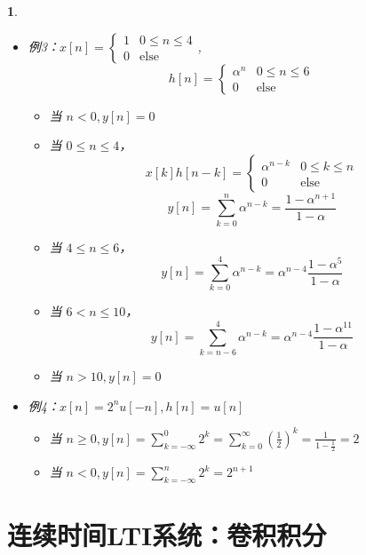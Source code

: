 \documentclass[UTF8]{report}
\theoremstyle{MyLineTheoremStyle} %
\theoremstyle{MyBlockTheoremStyle} %
\theoremstyle{MySubsubsectionStyle} %
\newtheorem{definition}{}
\begin{document}
\begin{definition}
\begin{itemize}
        \item 例3：$x[n] = \begin{cases} 
        1 & 0 \leq n \leq 4 \\
        0 & \text{else} 
        \end{cases}$,
        \[
        h[n] = \begin{cases} 
        \alpha^n & 0 \leq n \leq 6 \\
        0 & \text{else} 
        \end{cases}
        \]
        \begin{itemize}
            \item 当 $n < 0, y[n] = 0$
            \item 当 $0 \leq n \leq 4$，
            \[
            x[k] h[n - k] = \begin{cases} 
            \alpha^{n-k} & 0 \leq k \leq n \\
            0 & \text{else} 
            \end{cases}
            \]
            \[
            y[n] = \sum_{k=0}^{n} \alpha^{n-k} = \frac{1 - \alpha^{n+1}}{1 - \alpha}
            \]
            \item 当 $4 \leq n \leq 6$，
            \[
            y[n] = \sum_{k=0}^{4} \alpha^{n-k} = \alpha^{n-4} \frac{1 - \alpha^5}{1 - \alpha}
            \]
            \item 当 $6 < n \leq 10$，
            \[
            y[n] = \sum_{k=n-6}^{4} \alpha^{n-k} = \alpha^{n-4} \frac{1 - \alpha^{11}}{1 - \alpha}
            \]
            \item 当 $n > 10, y[n] = 0$
        \end{itemize}

        \item 例4：$x[n] = 2^n u[-n], h[n] = u[n]$
        \begin{itemize}
            \item 当 $n \geq 0, y[n] = \sum_{k=-\infty}^{0} 2^k = \sum_{k=0}^{\infty} \left(\frac{1}{2}\right)^k = \frac{1}{1 - \frac{1}{2}} = 2$
            \item 当 $n < 0, y[n] = \sum_{k=-\infty}^{n} 2^k = 2^{n+1}$
        \end{itemize}
    \end{itemize}
\end{definition}

\section{连续时间LTI系统：卷积积分}
\end{document}
